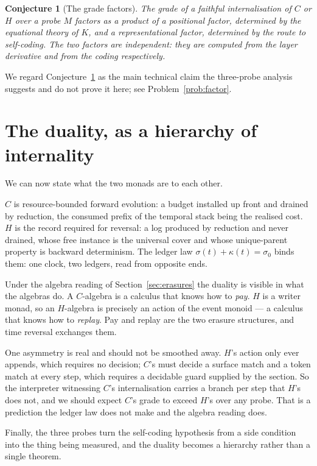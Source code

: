 \documentclass[11pt,a4paper]{article}
\theoremstyle{definition}
\theoremstyle{plain}
\newtheorem{conjecture}[definition]{Conjecture}
\theoremstyle{remark}
\begin{document}
\begin{conjecture}[The grade factors]
\label{conj:factor}
The grade of a faithful internalisation of $C$ or $H$ over a probe $M$ factors as a product of a
positional factor, determined by the equational theory of $K$, and a representational factor,
determined by the route to self-coding. The two factors are independent: they are computed from the
layer derivative and from the coding respectively.
\end{conjecture}

We regard Conjecture~\ref{conj:factor} as the main technical claim the three-probe analysis suggests
and do not prove it here; see Problem~\ref{prob:factor}.

\section{The duality, as a hierarchy of internality}
\label{sec:duality}

We can now state what the two monads are to each other.

$C$ is resource-bounded forward evolution: a budget installed up front and drained by reduction, the
consumed prefix of the temporal stack being the realised cost. $H$ is the record required for
reversal: a log produced by reduction and never drained, whose free instance is the universal cover
and whose unique-parent property is backward determinism. The ledger law
$\sigma(t) + \kappa(t) = \sigma_0$ binds them: one clock, two ledgers, read from opposite ends.

Under the algebra reading of Section~\ref{sec:erasures} the duality is visible in what the algebras
do. A $C$-algebra is a calculus that knows how to \emph{pay}. $H$ is a writer monad, so an
$H$-algebra is precisely an action of the event monoid --- a calculus that knows how to
\emph{replay}. Pay and replay are the two erasure structures, and time reversal exchanges them.

One asymmetry is real and should not be smoothed away. $H$'s action only ever appends, which requires
no decision; $C$'s must decide a surface match and a token match at every step, which requires a
decidable guard supplied by the section. So the interpreter witnessing $C$'s internalisation carries
a branch per step that $H$'s does not, and we should expect $C$'s grade to exceed $H$'s over any
probe. That is a prediction the ledger law does not make and the algebra reading does.

Finally, the three probes turn the self-coding hypothesis from a side condition into the thing being
measured, and the duality becomes a hierarchy rather than a single theorem.
\end{document}
